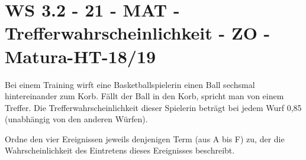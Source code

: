 \section{WS 3.2 - 21 - MAT - Trefferwahrscheinlichkeit - ZO - Matura-HT-18/19}

\begin{beispiel}[WS 3.2]{1}
Bei einem Training wirft eine Basketballspielerin einen Ball sechsmal hintereinander zum Korb.
Fällt der Ball in den Korb, spricht man von einem Treffer. Die Trefferwahrscheinlichkeit dieser
Spielerin beträgt bei jedem Wurf 0,85 (unabhängig von den anderen Würfen).\leer


Ordne den vier Ereignissen jeweils denjenigen Term (aus A bis F) zu, der die Wahrscheinlichkeit des Eintretens dieses Ereignisses beschreibt.

\end{beispiel}